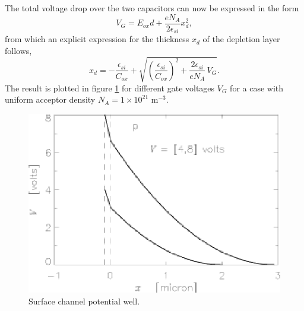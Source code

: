 The total voltage drop over the two capacitors can now be expressed in
the form
\begin{equation}
  V_G = E_{ox}d + \frac{e N_A}{2\epsilon_{si}} x_d^2,
  \label{CCD.surVG}
\end{equation}
from which an explicit expression for the thickness $x_d$ of the
depletion layer follows,
\begin{equation}
  x_d = -\frac{\epsilon_{si}}{C_{ox}} +
  \sqrt{\left(\frac{\epsilon_{si}}{C_{ox}}\right)^2
       +\frac{2\epsilon_{si}}{eN_A}\, V_G}.
  \label{CCD.xd}
\end{equation}
The result is plotted in figure \ref{CCD.figsurchan} for different
gate voltages $V_G$ for a case with uniform acceptor density $N_A =
1\times10^{21}$ m$^{-3}$.

\begin{figure}[h]
  \centering
	\includegraphics{CCD_surchan.eps}
  \caption{Surface channel potential well.}
  \label{CCD.figsurchan}
\end{figure}

